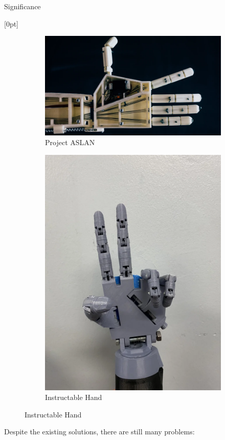 \documentclass[final, 20pt]{beamer}
\newlength{\colwidth}
\newlength{\twocolwidth}
\begin{document}
\begin{frame}[t]
\begin{columns}[t]
\begin{column}{\twocolwidth}
  \begin{block}{Significance}
    \begin{minipage}[t]{0.48\linewidth}
      [0pt]
    \begin{figure}[ht]
      \centering
      \begin{subfigure}[b]{0.45\linewidth}
        \centering
        \includegraphics[width=\linewidth]{images/aslan.png}
        \caption{Project ASLAN}
        \label{fig:aslan}
      \end{subfigure}
      \begin{subfigure}[b]{0.45\linewidth}
        \centering
        \includegraphics[width=0.425\linewidth]{images/instructable-hand.png}
        \caption{Instructable Hand}
        \label{fig:instructable-hand}
      \end{subfigure}
    \end{figure}
    \vspace{-1em}
    
    Despite the existing solutions, there are still many problems:
    

\end{minipage}
\end{block}
\end{column}
\end{columns}
\end{frame}
\end{document}
